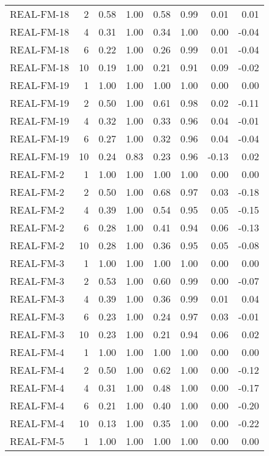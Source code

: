 \begin{table}[ht]
\begin{tabular}{lrrrrrrr}
  REAL-FM-18 &   2 & 0.58 & 1.00 & 0.58 & 0.99 & 0.01 & 0.01 \\ 
  REAL-FM-18 &   4 & 0.31 & 1.00 & 0.34 & 1.00 & 0.00 & -0.04 \\ 
  REAL-FM-18 &   6 & 0.22 & 1.00 & 0.26 & 0.99 & 0.01 & -0.04 \\ 
  REAL-FM-18 &  10 & 0.19 & 1.00 & 0.21 & 0.91 & 0.09 & -0.02 \\ 
  REAL-FM-19 &   1 & 1.00 & 1.00 & 1.00 & 1.00 & 0.00 & 0.00 \\ 
  REAL-FM-19 &   2 & 0.50 & 1.00 & 0.61 & 0.98 & 0.02 & -0.11 \\ 
  REAL-FM-19 &   4 & 0.32 & 1.00 & 0.33 & 0.96 & 0.04 & -0.01 \\ 
  REAL-FM-19 &   6 & 0.27 & 1.00 & 0.32 & 0.96 & 0.04 & -0.04 \\ 
  REAL-FM-19 &  10 & 0.24 & 0.83 & 0.23 & 0.96 & -0.13 & 0.02 \\ 
  REAL-FM-2 &   1 & 1.00 & 1.00 & 1.00 & 1.00 & 0.00 & 0.00 \\ 
  REAL-FM-2 &   2 & 0.50 & 1.00 & 0.68 & 0.97 & 0.03 & -0.18 \\ 
  REAL-FM-2 &   4 & 0.39 & 1.00 & 0.54 & 0.95 & 0.05 & -0.15 \\ 
  REAL-FM-2 &   6 & 0.28 & 1.00 & 0.41 & 0.94 & 0.06 & -0.13 \\ 
  REAL-FM-2 &  10 & 0.28 & 1.00 & 0.36 & 0.95 & 0.05 & -0.08 \\ 
  REAL-FM-3 &   1 & 1.00 & 1.00 & 1.00 & 1.00 & 0.00 & 0.00 \\ 
  REAL-FM-3 &   2 & 0.53 & 1.00 & 0.60 & 0.99 & 0.00 & -0.07 \\ 
  REAL-FM-3 &   4 & 0.39 & 1.00 & 0.36 & 0.99 & 0.01 & 0.04 \\ 
  REAL-FM-3 &   6 & 0.23 & 1.00 & 0.24 & 0.97 & 0.03 & -0.01 \\ 
  REAL-FM-3 &  10 & 0.23 & 1.00 & 0.21 & 0.94 & 0.06 & 0.02 \\ 
  REAL-FM-4 &   1 & 1.00 & 1.00 & 1.00 & 1.00 & 0.00 & 0.00 \\ 
  REAL-FM-4 &   2 & 0.50 & 1.00 & 0.62 & 1.00 & 0.00 & -0.12 \\ 
  REAL-FM-4 &   4 & 0.31 & 1.00 & 0.48 & 1.00 & 0.00 & -0.17 \\ 
  REAL-FM-4 &   6 & 0.21 & 1.00 & 0.40 & 1.00 & 0.00 & -0.20 \\ 
  REAL-FM-4 &  10 & 0.13 & 1.00 & 0.35 & 1.00 & 0.00 & -0.22 \\ 
  REAL-FM-5 &   1 & 1.00 & 1.00 & 1.00 & 1.00 & 0.00 & 0.00 \\ 

\end{tabular}
\end{table}
